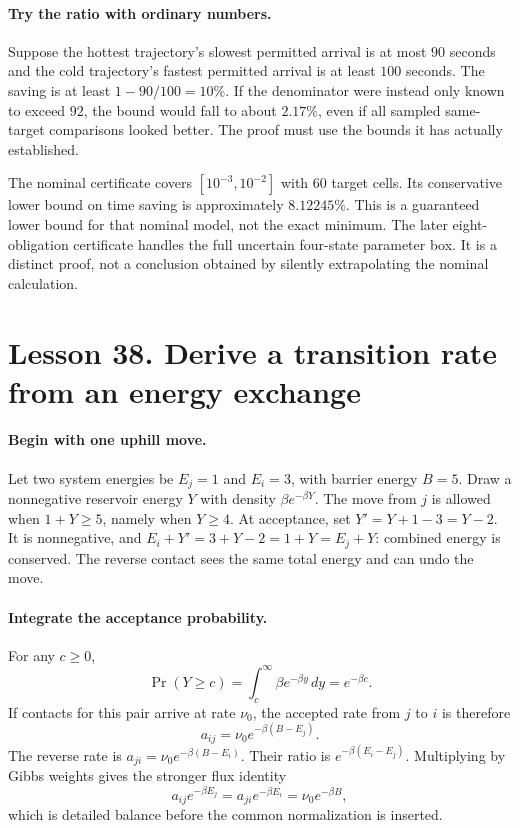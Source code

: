 \documentclass[11pt]{article}
\begin{document}
\paragraph{Try the ratio with ordinary numbers.}
Suppose the hottest trajectory's slowest permitted arrival is at most
$90$ seconds and the cold trajectory's fastest permitted arrival is at
least $100$ seconds. The saving is at least $1-90/100=10\%$.
If the denominator were instead only known to exceed $92$, the bound would
fall to about $2.17\%$, even if all sampled same-target comparisons looked
better. The proof must use the bounds it has actually established.

The nominal certificate covers $[10^{-3},10^{-2}]$ with 60 target cells.
Its conservative lower bound on time saving is approximately $8.12245\%$.
This is a guaranteed lower bound for that nominal model, not the exact
minimum. The later eight-obligation certificate handles the full uncertain
four-state parameter box. It is a distinct proof, not a conclusion obtained
by silently extrapolating the nominal calculation.

\section*{Lesson 38. Derive a transition rate from an energy exchange}
\paragraph{Begin with one uphill move.}
Let two system energies be $E_j=1$ and $E_i=3$, with barrier energy $B=5$.
Draw a nonnegative reservoir energy $Y$ with density $\beta e^{-\beta Y}$.
The move from $j$ is allowed when $1+Y\geq5$, namely when $Y\geq4$.
At acceptance, set $Y'=Y+1-3=Y-2$. It is nonnegative, and
$E_i+Y'=3+Y-2=1+Y=E_j+Y$: combined energy is conserved.
The reverse contact sees the same total energy and can undo the move.

\paragraph{Integrate the acceptance probability.}
For any $c\geq0$,
\[
 \Pr(Y\geq c)=\int_c^\infty\beta e^{-\beta y}\,dy=e^{-\beta c}.
\]
If contacts for this pair arrive at rate $\nu_0$, the accepted rate from
$j$ to $i$ is therefore
\[
 a_{ij}=\nu_0e^{-\beta(B-E_j)}.
\]
The reverse rate is $a_{ji}=\nu_0e^{-\beta(B-E_i)}$.
Their ratio is $e^{-\beta(E_i-E_j)}$. Multiplying by Gibbs weights
gives the stronger flux identity
\[
 a_{ij}e^{-\beta E_j}=a_{ji}e^{-\beta E_i}
 =\nu_0e^{-\beta B},
\]
which is detailed balance before the common normalization is inserted.
\end{document}
